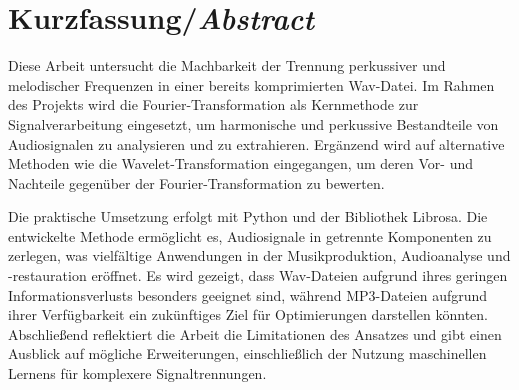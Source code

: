 \chapter*{Kurzfassung/\emph{Abstract}}
\label{chap:abstract}
%

Diese Arbeit untersucht die Machbarkeit der Trennung perkussiver und melodischer Frequenzen in einer bereits komprimierten Wav-Datei. Im Rahmen des Projekts wird die Fourier-Transformation als Kernmethode zur Signalverarbeitung eingesetzt, um harmonische und perkussive Bestandteile von Audiosignalen zu analysieren und zu extrahieren. Ergänzend wird auf alternative Methoden wie die Wavelet-Transformation eingegangen, um deren Vor- und Nachteile gegenüber der Fourier-Transformation zu bewerten.

Die praktische Umsetzung erfolgt mit Python und der Bibliothek Librosa. Die entwickelte Methode ermöglicht es, Audiosignale in getrennte Komponenten zu zerlegen, was vielfältige Anwendungen in der Musikproduktion, Audioanalyse und -restauration eröffnet. Es wird gezeigt, dass Wav-Dateien aufgrund ihres geringen Informationsverlusts besonders geeignet sind, während MP3-Dateien aufgrund ihrer Verfügbarkeit ein zukünftiges Ziel für Optimierungen darstellen könnten. Abschließend reflektiert die Arbeit die Limitationen des Ansatzes und gibt einen Ausblick auf mögliche Erweiterungen, einschließlich der Nutzung maschinellen Lernens für komplexere Signaltrennungen.
\par

